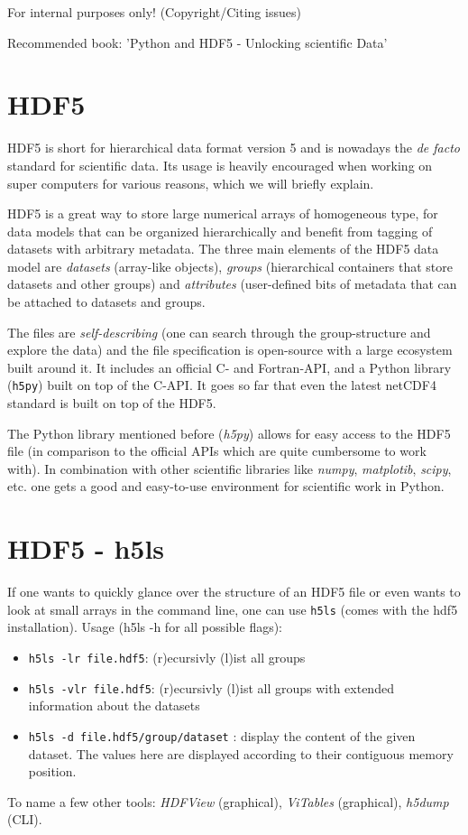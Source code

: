 \documentclass[a4paper,11pt]{article}
\numberwithin{equation}{section} %
\begin{document}
For internal purposes only! (Copyright/Citing issues)

Recommended book: 'Python and HDF5 - Unlocking scientific Data'

\section{HDF5}
HDF5 is short for hierarchical data format version 5 and is nowadays the \emph{de facto} standard for scientific data.
Its usage is heavily encouraged when working on super computers for various reasons, which we will briefly explain.

HDF5 is a great way to store large numerical arrays of homogeneous type,
for data models that can be organized hierarchically and benefit from tagging of datasets with arbitrary metadata.
The three main elements of the HDF5 data model are \emph{datasets} (array-like objects), \emph{groups}
(hierarchical containers that store datasets and other groups) and \emph{attributes} (user-defined bits of metadata that can be attached to datasets and groups.

The files are \emph{self-describing} (one can search through the group-structure and explore the data)
and the file specification is open-source with a large ecosystem built around it.
It includes an official C- and Fortran-API, and a Python library (\verb|h5py|) built on top of the C-API.
It goes so far that even the latest netCDF4 standard is built on top of the HDF5.

The Python library mentioned before (\emph{h5py}) allows for easy access to the HDF5 file
(in comparison to the official APIs which are quite cumbersome to work with).
In combination with other scientific libraries like \emph{numpy}, \emph{matplotib}, \emph{scipy},
etc. one gets a good and easy-to-use environment for scientific work in Python.

\section{HDF5 - h5ls}

If one wants to quickly glance over the structure of an HDF5 file or even wants to look at small arrays
in the command line, one can use \verb|h5ls| (comes with the hdf5 installation). Usage (h5ls -h for all possible flags):

\begin{itemize}
\item{{\color{blue}\verb|h5ls -lr file.hdf5|}: (r)ecursivly (l)ist all groups}
\item{{\color{blue}\verb|h5ls -vlr file.hdf5|}: (r)ecursivly (l)ist all groups with extended information about the datasets}
\item{{\color{blue}\verb|h5ls -d file.hdf5/group/dataset|} : display the content of the given dataset. The values here are displayed according to their contiguous memory position.}
\end{itemize}
To name a few other tools: \emph{HDFView} (graphical), \emph{ViTables} (graphical), \emph{h5dump} (CLI).
\end{document}

